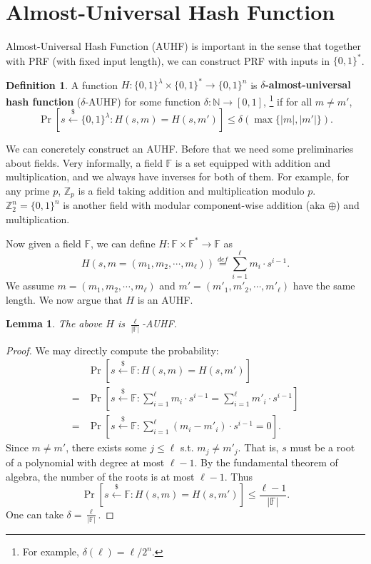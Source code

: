 \documentclass[12pt]{article}
\newcommand{\eqdef}{\stackrel{def}{=}}
\newcommand{\N}{\mathbb{N}}
\newcommand{\Z}{\mathbb{Z}}
\newcommand{\F}{\mathbb{F}}
\newcommand{\bits}{\{0,1\}}
\newcommand{\getsr}{\stackrel{\$}{\gets}}
\newtheorem{lemma}[theorem]{Lemma}
\theoremstyle{definition}
\newtheorem{definition}[theorem]{Definition}
\begin{document}
\section{Almost-Universal Hash Function}
Almost-Universal Hash Function (AUHF) is important in the sense that together with PRF (with fixed input length), we can construct PRF with inputs in $\bits^*$.

\begin{definition}
A function $H : \bits^\lambda \times \bits^* \to \bits^n$ is {\bf $\delta$-almost-universal hash function} ($\delta$-AUHF) for some function $\delta : \N \to [0,1]$, \footnote{For example, $\delta(\ell) = \ell/2^n$.} if for all $m \not= m'$,
$$\Pr[s \getsr \bits^\lambda : H(s,m) = H(s, m')] \leq \delta(\max\{|m|, |m'|\}).$$ 
\end{definition}

We can concretely construct an AUHF. Before that we need some preliminaries about fields. Very informally, a field $\F$ is a set equipped with addition and multiplication, and we always have inverses for both of them. For example, for any prime $p$, $\Z_p$ is a field taking addition and multiplication modulo $p$. $\Z_2^n = \bits^n$ is another field with modular component-wise addition (aka $\oplus$) and multiplication. 

Now given a field $\F$, we can define $H : \F \times \F^* \to \F$ as
$$H(s, m=(m_1, m_2, \cdots, m_\ell)) \eqdef \sum_{i=1}^{\ell} m_i \cdot s^{i-1}.$$
We assume $m = (m_1, m_2, \cdots, m_\ell)$ and $m' = (m'_1, m'_2, \cdots, m'_\ell)$ have the same length. We now argue that $H$ is an AUHF.

\begin{lemma}
The above $H$ is $\frac{\ell}{|\F|}$-AUHF.
\end{lemma}
\begin{proof}
We may directly compute the probability:
$$\begin{aligned}
& \Pr[s \getsr \F : H(s,m) = H(s,m')] \\ 
=& \Pr[s \getsr \F : \sum_{i=1}^{\ell} m_i \cdot s^{i-1} = \sum_{i=1}^{\ell} m'_i \cdot s^{i-1}] \\
=& \Pr[s \getsr \F : \sum_{i=1}^{\ell} (m_i-m'_i) \cdot s^{i-1} = 0].
\end{aligned}$$
Since $m \not= m'$, there exists some $j \leq \ell$ s.t. $m_j \not= m'_j$. That is, $s$ must be a root of a polynomial with degree at most $\ell-1$. By the fundamental theorem of algebra, the number of the roots is at most $\ell-1$. Thus
$$\Pr[s \getsr \F : H(s,m) = H(s,m')] \leq \frac{\ell-1}{|\F|}.$$
One can take $\delta = \frac{\ell}{|\F|}$.
\end{proof}
\end{document}
